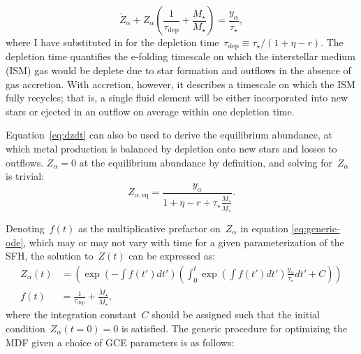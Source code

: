 \documentclass[12pt]{article}
\newcommand{\ddfrac}[2]{\frac{\displaystyle{#1}}{\displaystyle{#2}}}
\newcommand{\timescale}[1]{\ensuremath{\tau_\text{#1}}}
\begin{document}
\begin{equation}
\dot{Z}_\alpha + Z_\alpha\left(\frac{1}{\timescale{dep}} +
\frac{\ddot{M}_\star}{M_\star}\right) = \frac{y_\alpha}{\tau_\star},
\label{eq:generic-ode}
\end{equation}
where I have substituted in for the depletion time~$\timescale{dep} \equiv
\tau_\star / (1 + \eta - r)$.
The depletion time quantifies the e-folding timescale on which the interstellar
medium (ISM) gas would be deplete due to star formation and outflows in the
absence of gas accretion.
With accretion, however, it describes a timescale on which the ISM fully
recycles; that is, a single fluid element will be either incorporated into new
stars or ejected in an outflow on average within one depletion time.
\par
Equation~\ref{eq:dzdt} can also be used to derive the equilibrium abundance,
at which metal production is balanced by depletion onto new stars and losses to
outflows.
$\dot{Z}_\alpha = 0$ at the equilibrium abundance by definition, and solving
for~$Z_\alpha$ is trivial:
\begin{equation}
Z_{\alpha,\text{eq}} = \ddfrac{y_\alpha}{
	1 + \eta - r + \tau_\star \frac{\ddot{M}_\star}{\dot{M}_\star}
}.
\end{equation}
\par
Denoting~$f(t)$ as the multiplicative prefactor on~$Z_\alpha$ in equation
\ref{eq:generic-ode}, which may or may not vary with time for a given
parameterization of the SFH, the solution to~$Z(t)$ can be expressed as:
\begin{subequations}\begin{align}
Z_\alpha(t) &= \left(
\exp\left(-\int f(t') dt'\right) \left(\int_0^t \exp\left(\int f(t') dt'\right)
\frac{y_\alpha}{\tau_\star}dt' + C\right)
\right)
\label{eq:generic-ode-solution}
\\
f(t) &= \frac{1}{\timescale{dep}} + \frac{\ddot{M}_\star}{\dot{M}_\star},
\label{eq:f}
\end{align}\end{subequations}
where the integration constant~$C$ should be assigned such that the initial
condition~$Z_\alpha(t = 0) = 0$ is satisfied.
The generic procedure for optimizing the MDF given a choice of GCE parameters
is as follows:
\end{document}
